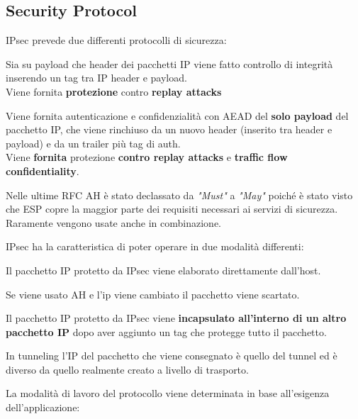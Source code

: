 \subsection{Security Protocol}
IPsec prevede due differenti protocolli di sicurezza:
\begin{definition}\label{def:ah}
Sia su payload che header dei pacchetti IP viene fatto controllo di integrità inserendo un tag tra IP header e payload. \\
Viene fornita \textbf{protezione} contro \textbf{replay attacks}
\end{definition}
\begin{definition}
Viene fornita autenticazione e confidenzialità con AEAD del \textbf{solo payload} del pacchetto IP, che viene rinchiuso da un nuovo header (inserito tra header e payload) e da un trailer più tag di auth.\\
Viene \textbf{fornita} protezione \textbf{contro replay attacks} e \textbf{traffic flow confidentiality}.
\end{definition}
\begin{remark}
Nelle ultime RFC AH è stato declassato da \textit{"Must"} a \textit{"May"} poiché è stato visto che ESP copre la maggior parte dei requisiti necessari ai servizi di sicurezza. Raramente vengono usate anche in combinazione.
\end{remark}
IPsec ha la caratteristica di poter operare in due modalità differenti:
\begin{definition}\label{def:transport}
Il pacchetto IP protetto da IPsec viene elaborato direttamente dall'host.\\
\begin{remark}
Se viene usato AH e l'ip viene cambiato il pacchetto viene scartato.
\end{remark}
\end{definition}\pagebreak
\begin{definition}\label{def:tunnel}
Il pacchetto IP protetto da IPsec viene \textbf{incapsulato all'interno di un altro pacchetto IP} dopo aver aggiunto un tag che protegge tutto il pacchetto.\\
\begin{remark}
In tunneling l'IP del pacchetto che viene consegnato è quello del tunnel ed è diverso da quello realmente creato a livello di trasporto.
\end{remark}
\end{definition}
La modalità di lavoro del protocollo viene determinata in base all'esigenza dell'applicazione:
